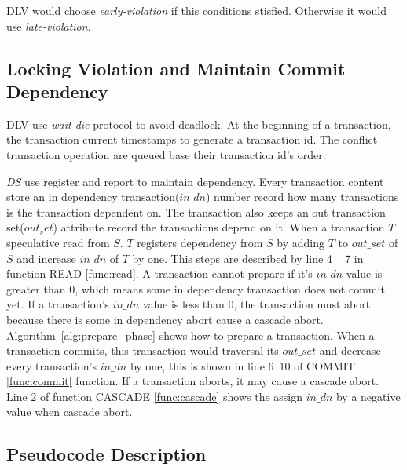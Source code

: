 \documentclass[conference]{IEEEtran}
\begin{document}
DLV would choose \emph{early-violation} if this conditions stisfied. 
Otherwise it would use \emph{late-violation}.


\subsection {Locking Violation and Maintain Commit Dependency}
DLV use \emph{wait-die} protocol to avoid deadlock.
At the beginning of a transaction, the transaction current timestamps to generate a transaction id.
The conflict transaction operation are queued base their transaction id's order. 


\emph{DS} use register and report\cite{HeckatonMVCC:journals/pvldb/LarsonBDFPZ11} to maintain dependency.
Every transaction content store an in dependency transaction(${in\_dn}$) number record how many transactions is the transaction dependent on.
The transaction also keeps an out transaction set(${out_set}$) attribute record the transactions depend on it.
When a transaction ${T}$ speculative read from ${S}$.
${T}$ registers dependency from ${S}$ by adding ${T}$ to ${out\_set}$ of ${S}$ and increase ${in\_dn}$ of ${T}$ by one.
This steps are described by line 4 ~ 7 in function READ \ref{func:read}.
A transaction cannot prepare if it's ${in\_dn}$ value is greater than 0, which means some in dependency transaction does not commit yet.
If a transaction's ${in\_dn}$ value is less than 0, the transaction must abort because there is some in dependency abort cause a cascade abort.
Algorithm~\ref{alg:prepare_phase} shows how to prepare a transaction.
When a transaction commits, this transaction would traversal its ${out\_set}$ and decrease every transaction's ${in\_dn}$ by one, this is shown in line 6~10 of COMMIT \ref{func:commit} function.
If a transaction aborts, it may cause a cascade abort.
Line 2 of function CASCADE \ref{func:cascade} shows the assign ${in\_dn}$ by a negative value when cascade abort.

\subsection{Pseudocode Description}
\end{document}
